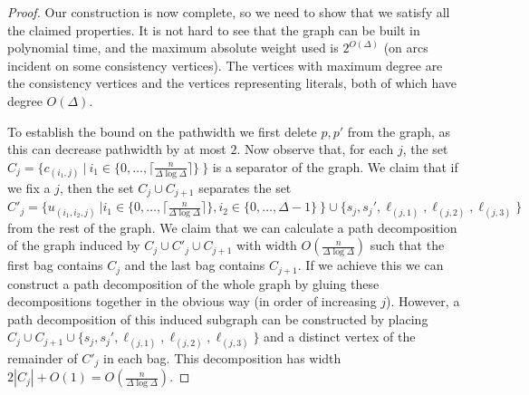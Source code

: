 \documentclass[letterpaper,USenglish,cleveref, autoref, thm-restate]{lipics-v2021}
\begin{document}
\begin{proof}
Our construction is now complete, so we need to show that we satisfy all the
claimed properties. It is not hard to see that the graph can be built in
polynomial time, and the maximum absolute weight used is $2^{O(\Delta)}$ (on
arcs incident on some consistency vertices). The vertices with maximum degree
are the consistency vertices and the vertices representing literals, both of
which have degree $O(\Delta)$.

To establish the bound on the pathwidth we first delete $p,p'$ from the graph,
as this can decrease pathwidth by at most $2$. Now observe that, for each $j$,
the set $C_j= \{ c_{(i_1,j)}\ |\
i_1\in\{0,\ldots,\lceil\frac{n}{\Delta\log\Delta}\rceil\}\ \}$ is a separator
of the graph. We claim that if we fix a $j$, then the set $C_j\cup C_{j+1}$
separates the set $C'_j = \{ u_{(i_1,i_2,j)}\ |
i_1\in\{0,\ldots,\lceil\frac{n}{\Delta\log\Delta}\rceil\},
i_2\in\{0,\ldots,\Delta-1\}\ \} \cup \{s_j, s_j', \ell_{(j,1)}, \ell_{(j,2)},
\ell_{(j,3)}\}$ from the rest of the graph. We claim that we can calculate a
path decomposition of the graph induced by $C_j\cup C'_j\cup C_{j+1}$ with
width $O(\frac{n}{\Delta\log\Delta})$ such that the first bag contains $C_j$
and the last bag contains $C_{j+1}$. If we achieve this we can construct a path
decomposition of the whole graph by gluing these decompositions together in the
obvious way (in order of increasing $j$). However, a path decomposition of this
induced subgraph can be constructed by placing $C_j\cup C_{j+1}\cup \{s_j,
s_j', \ell_{(j,1)}, \ell_{(j,2)}, \ell_{(j,3)}\}$ and a distinct vertex of the
remainder of $C'_j$ in each bag. This decomposition has width $2|C_j|+O(1) =
O(\frac{n}{\Delta\log\Delta})$.


\end{proof}
\end{document}

